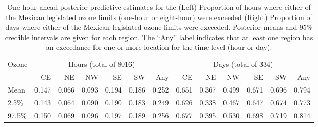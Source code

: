 \documentclass[alpha-refs]{wiley-article}
\begin{document}

\vspace{-3mm}
\begin{table}[H]
\centering
\footnotesize
\begin{tabular}{l|rrrrrr|rrrrrr}
\hline
Ozone &\multicolumn{6}{c|}{Hours (total of 8016) } & \multicolumn{6}{|c}{Days (total of 334)}\\
 & CE & NE & NW & SE & SW & Any & CE & NE & NW & SE & SW & Any \\
  \hline
Mean & 0.147 & 0.066 & 0.093 & 0.194 & 0.186 & 0.252 & 0.651 & 0.367 & 0.499 & 0.671 & 0.696 & 0.794 \\
  2.5\% & 0.143 & 0.064 & 0.090 & 0.190 & 0.183 & 0.249 & 0.626 & 0.338 & 0.467 & 0.647 & 0.674 & 0.773 \\
  97.5\% & 0.150 & 0.069 & 0.096 & 0.197 & 0.189 & 0.256 & 0.677 & 0.395 & 0.530 & 0.698 & 0.719 & 0.814 \\
   \hline
\end{tabular}
\caption{One-hour-ahead posterior predictive estimates for the (Left) Proportion of hours where either of the Mexican legislated ozone limits (one-hour or eight-hour) were exceeded (Right) Proportion of days where either of the Mexican legislated ozone limits were exceeded. Posterior means and 95\% credible intervals are given for each region. The ``Any'' label indicates that at least one region has an exceedance for one or more location for the time level (hour or day). }\label{tab:ozone_region}
\end{table}
\vspace{-3mm}
\end{document}
